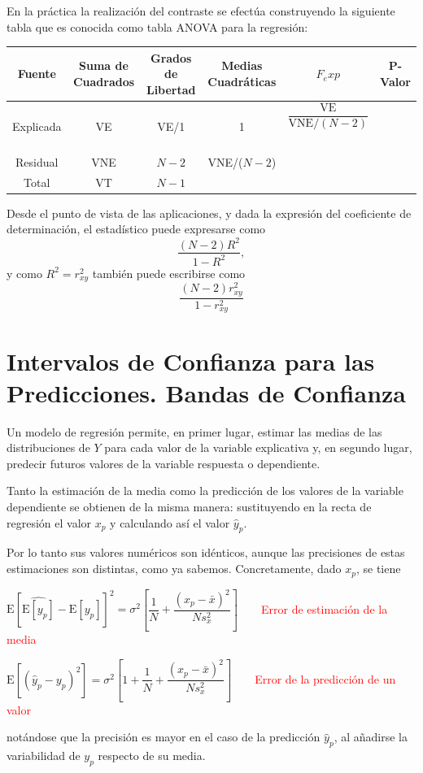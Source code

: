 \documentclass[10pt,a4paper]{book}
\begin{document}
En la práctica la realización del contraste se efectúa construyendo la siguiente tabla que es conocida como tabla ANOVA para la regresión:
\begin{table}
\begin{tabular}{|c|c|c|c|c|c|c|}
\hline 
Fuente & Suma de Cuadrados & Grados de Libertad & Medias Cuadráticas & \multicolumn{2}{|c|}{$F_exp$} & P-Valor \\ 
\hline 
\multirow{2}{1.5cm}{Explicada} & \multirow{2}{0.5cm}{VE} & \multirow{2}{0.7cm}{VE/1} & \multirow{2}{0.5cm}{1} & \multicolumn{2}{|c|}{$\dfrac{\mathrm{VE}}{\mathrm{VNE}/(N-2)}$} &  \\
 & & & & \multicolumn{2}{|c|}{\ } & \\
Residual & VNE & $N-2$ & VNE/($N-2$) & \multicolumn{2}{|c|}{\ } &  \\ 
Total & VT & $N-1$ &  & \multicolumn{2}{|c|}{\ } &  \\ 
\hline 
\end{tabular} 
\end{table}

Desde el punto de vista de las aplicaciones, y dada la expresión del coeficiente de determinación, el estadístico puede expresarse como 
$$\dfrac{(N-2)R^2}{1-R^2},$$
y como $R^2=r^2_{xy}$ también puede escribirse como 
$$\dfrac{(N-2)r^2_{xy}}{1-r^2_{xy}}$$
	\section{Intervalos de Confianza para las Predicciones. Bandas de Confianza}
Un modelo de regresión permite, en primer lugar, estimar las medias de las distribuciones de $Y$ para cada valor de la variable explicativa y, en segundo lugar, predecir futuros valores de la variable respuesta o dependiente.

Tanto la estimación de la media como la predicción de los valores de la variable dependiente se obtienen de la misma manera: sustituyendo en la recta de regresión el valor $x_p$ y calculando así el valor $\widehat{y}_p$.

Por lo tanto sus valores numéricos son idénticos, aunque las precisiones de estas estimaciones son distintas, como ya sabemos. Concretamente, dado $x_p$, se tiene
\begin{center}
$\mathrm{E}\left[\widehat{\mathrm{E}[y_p]}-\mathrm{E}[y_p]\right]^2=\sigma^2\left[\dfrac{1}{N}+\dfrac{(x_p-\bar{x})^2}{Ns^2_x}\right]\qquad$\textcolor{red}{Error de estimación de la media}
\end{center}
\begin{center}
$\mathrm{E}[(\widehat{y}_p-y_p)^2]=\sigma^2\left[1+\dfrac{1}{N}+\dfrac{(x_p-\bar{x})^2}{Ns^2_x}\right]\qquad$\textcolor{red}{Error de la predicción de un valor}
\end{center}
notándose que la precisión es mayor en el caso de la predicción $\widehat{y}_p$, al añadirse la variabilidad de $y_p$ respecto de su media.
\end{document}
